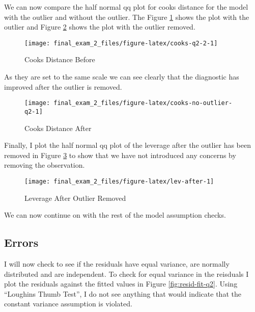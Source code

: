 \documentclass[]{book}
\begin{document}
We can now compare the half normal qq plot for cooks distance for the model with the outlier and without the outlier. The Figure \ref{fig:cooks-q2-2} shows the plot with the outlier and Figure \ref{fig:cooks-no-outlier-q2} shows the plot with the outlier removed.

\begin{figure}

{\centering \texttt{[image: final\_exam\_2\_files/figure-latex/cooks-q2-2-1]} 

}

\caption{Cooks Distance Before}\label{fig:cooks-q2-2}
\end{figure}

As they are set to the same scale we can see clearly that the diagnostic has improved after the outlier is removed.

\begin{figure}

{\centering \texttt{[image: final\_exam\_2\_files/figure-latex/cooks-no-outlier-q2-1]} 

}

\caption{Cooks Distance After}\label{fig:cooks-no-outlier-q2}
\end{figure}

Finally, I plot the half normal qq plot of the leverage after the outlier has been removed in Figure \ref{fig:lev-after} to show that we have not introduced any concerns by removing the observation.

\begin{figure}

{\centering \texttt{[image: final\_exam\_2\_files/figure-latex/lev-after-1]} 

}

\caption{Leverage After Outlier Removed}\label{fig:lev-after}
\end{figure}

We can now continue on with the rest of the model assumption checks.

\hypertarget{errors}{%
\subsection{Errors}\label{errors}}

I will now check to see if the residuals have equal variance, are normally distributed and are independent. To check for equal variance in the reisduals I plot the residuals against the fitted values in Figure \ref{fig:resid-fit-q2}. Using ``Loughins Thumb Test'', I do not see anything that would indicate that the constant variance assumption is violated.
\end{document}
